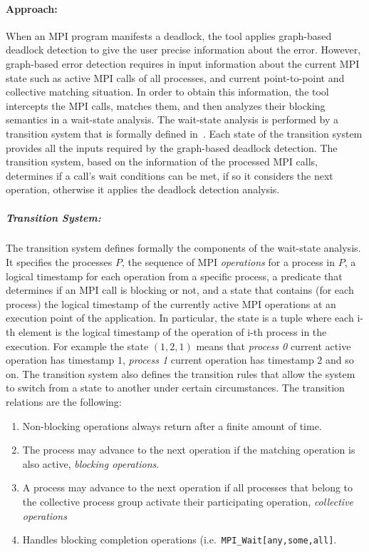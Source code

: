 \begin{refsection}
\paragraph{Approach:}
When an MPI program manifests a deadlock, the tool applies graph-based
deadlock detection to give the user precise information about the error.
%
However, graph-based error detection requires in input information about the
current MPI state such as active MPI calls of all processes, and current
point-to-point and collective matching situation.
%
In order to obtain this information, the tool intercepts the MPI calls,
matches them, and then analyzes their blocking semantics in a wait-state
analysis.
%
The wait-state analysis is performed by a transition system that is formally
defined in~\cite{Hilbrich:2013:DWS:2503210.2503237}.
%
Each state of the transition system provides all the inputs required by the
graph-based deadlock detection.
%
The transition system, based on the information of the processed MPI calls,
determines if a call's wait conditions can be met, if so it considers the next
operation, otherwise it applies the deadlock detection analysis.

\subparagraph{Transition System:} The transition system defines formally the
components of the wait-state analysis.
%
It specifies the processes $P$, the sequence of MPI \emph{operations} for a
process in $P$, a logical timestamp for each operation from a specific
process, a predicate that determines if an MPI call is blocking or not, and a
state that contains (for each process) the logical timestamp of the currently
active MPI operations at an execution point of the application.
%
In particular, the state is a tuple where each i-th element is the logical
timestamp of the operation of i-th process in the execution.
%
For example the state $(1,2,1)$ means that \emph{process 0} current active
operation has timestamp $1$, \emph{process 1} current operation has timestamp
$2$ and so on.
%
The transition system also defines the transition rules that allow the system
to switch from a state to another under certain circumstances.
%
The transition relations are the following:

\begin{enumerate}
\item Non-blocking operations always return after a finite amount of time.
\item The process may advance to the next operation if the matching operation
  is also active, \emph{blocking operations}.
\item A process may advance to the next operation if all processes that belong
  to the collective process group activate their participating operation,
  \emph{collective operations}
\item Handles blocking completion operations (i.e.\
  \texttt{MPI\_Wait[any,some,all]}.
\end{enumerate}


\end{refsection}
